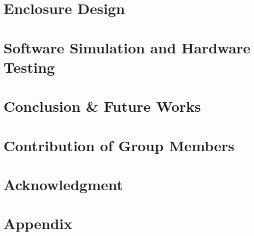 \documentclass{article}
\begin{document}
	
	\section{Enclosure Design}
	
	\section{Software Simulation and Hardware Testing}

	
	\section{Conclusion \& Future Works}
	
	\section{Contribution of Group Members}
	
	
	\section*{Acknowledgment}

	
	



	
	\section*{Appendix}

	
\end{document}
